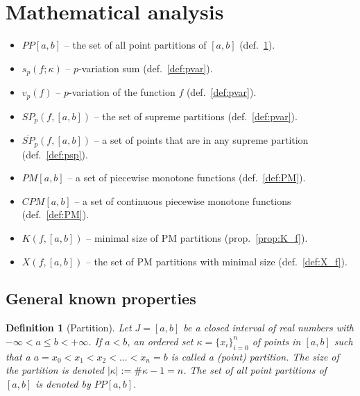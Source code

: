 \documentclass[12pt, a4paper]{article}
\newtheorem{definition}[theorem]{Definition}
\numberwithin{equation}{section}
\begin{document}

\section{Mathematical analysis}


\begin{itemize}  
  \item $PP[a,b]$ --  the set of all point partitions of $[a,b]$
    (def.~\ref{def:pp}).
  \item $s_{p}(f;\kappa)$ --  $p$-variation sum (def.~\ref{def:pvar}).
  \item $v_{p}\left( f\right)$ -- $p$-variation of the function $f$
    (def.~\ref{def:pvar}).
  \item $SP_{p}(f,[a,b])$ -- the set of supreme partitions
    (def.~\ref{def:pvar}).
  \item $\overline{SP}_{p}(f,[a,b])$ -- a set of points that are
    in any supreme partition (def.~\ref{def:psp}).
  \item $PM[a,b]$ -- a set of piecewise monotone functions
    (def.~\ref{def:PM}).  
  \item $CPM[a,b]$ -- a set of continuous piecewise monotone functions
    (def.~\ref{def:PM}).
  \item $K(f,[a,b])$ -- minimal size of PM partitions
    (prop.~\ref{prop:K_f}).
  \item $X(f,[a,b])$ -- the set of PM partitions with minimal size
    (def.~\ref{def:X_f}).
\end{itemize} 


\subsection{General known properties}
  
  
\begin{definition}[Partition]\label{def:pp}
  Let $J = [a,b]$ be a closed interval of real numbers with 
  $-\infty < a \leq b <+\infty$. 
  If $a < b$, an ordered set $\kappa = \{x_{i}\}_{i=0}^{n}$ 
  of points in $[a,b]$ such that a  
  $a=x_{0}<x_{1}<x_{2}<...<x_{n}=b$ is called a \emph{(point) partition}. 
  The size of the partition is denoted $\left|\kappa \right| :=\#\kappa-1=n$. 
  The set of all point partitions of $[a,b]$ is denoted by $PP[a,b]$.  
\end{definition} 
 
\end{document}
